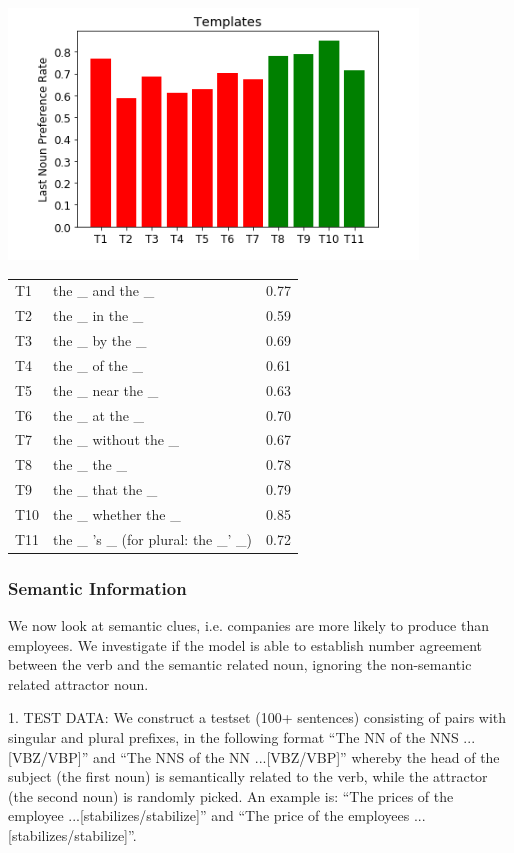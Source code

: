 \begin{multicols}{2}
\includegraphics[scale=0.5]{screenshot-syntactic-templates} 
 
 
\begin{tabular}{ l l r }
  T1    & the \_ and the \_     &  0.77 \\
  T2    & the \_ in the \_      &  0.59 \\
  T3    & the \_ by the \_      &  0.69 \\
  T4    & the \_ of the \_      &  0.61 \\
  T5    & the \_ near the \_    &  0.63\\
  T6    & the \_ at the \_      &  0.70\\
  T7    & the \_ without the \_ & 0.67  \\
  T8    & the \_ the \_         &  0.78\\
  T9    & the \_ that the \_    &  0.79\\
  T10   & the \_ whether the \_ &  0.85\\
  T11   & the \_ 's \_ (for plural: the \_' \_)          &  0.72 \\
\end{tabular}

\subsubsection{Semantic Information}

We now look at semantic clues, i.e. companies
are more likely to produce than employees.
We investigate if the model is able to establish
number agreement between the verb and the semantic related noun,
ignoring the non-semantic related attractor noun.
  
1. TEST DATA:
We construct a testset (100+ sentences) consisting of pairs with singular and plural prefixes, in the following format  
``The NN of the NNS ...[VBZ/VBP]'' and
``The NNS of the NN ...[VBZ/VBP]'' 
whereby the head of the subject (the first noun)
is semantically related to the verb, while the attractor (the second noun)
is randomly picked. An example is:
``The prices of the employee ...[stabilizes/stabilize]'' and 
``The price of the employees ...[stabilizes/stabilize]''.


\end{multicols}
